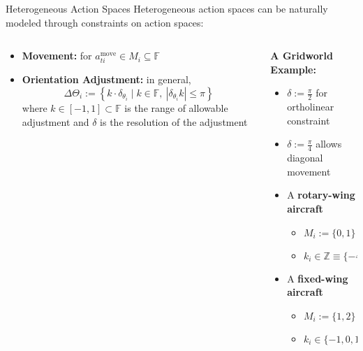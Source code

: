 \begin{frame}{Heterogeneous Action Spaces}
    Heterogeneous action spaces can be naturally modeled through constraints on action spaces:
    \begin{columns}[T]
        \begin{column}{0.5\textwidth}
            \begin{itemize}
                \item \textbf{Movement:} for \(a_{ti}^\text{move} \in M_i \subseteq \mathbb{F}\)
                \item \textbf{Orientation Adjustment:} in general,
                    \[
                        \Delta\Theta_i := \left\{ k \cdot \delta_{\theta_i} 
                        \mid k \in \mathbb{F},\ |\delta_{\theta_i} k| \leq \pi \right\}
                    \]
                where \(k \in [-1,1] \subset \mathbb{F}\) is the range of allowable adjustment
                and \(\delta\) is the resolution of the adjustment 
            \end{itemize}
        \end{column}
        \begin{column}{0.5\textwidth}
            \textbf{A Gridworld Example:}
                \begin{itemize}
                    \item \(\delta := \frac{\pi}{2}\) for ortholinear constraint
                    \item \(\delta := \frac{\pi}{4}\) allows diagonal movement
                    \item A \textbf{rotary-wing aircraft} 
                    \begin{itemize}
                        \item \(M_i := \{0,1\}\)
                        \item \(k_i \in \mathbb{Z} \equiv \{-4, \ldots, 4\} \)
                    \end{itemize}
                    \item A \textbf{fixed-wing aircraft}
                    \begin{itemize}
                        \item \(M_i := \{1,2\}\)
                        \item \(k_i \in \{-1,0,1\}\)
                    \end{itemize}
                \end{itemize}
        \end{column}
    \end{columns}
\end{frame}

